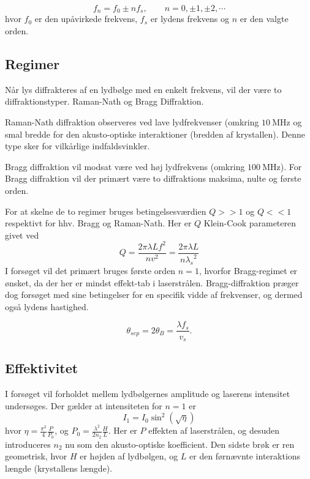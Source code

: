 \documentclass[main]{subfiles}
\begin{document}
\begin{equation}
    f_n = f_0 \pm nf_s, \qquad n=0, \pm1, \pm2, \cdots
    \label{eq:frequence}
\end{equation}
hvor $f_0$ er den upåvirkede frekvens, $f_s$ er lydens frekvens og $n$ er den valgte orden.

\subsection{Regimer}
Når lys diffrakteres af en lydbølge med en enkelt frekvens, vil der være to diffraktionstyper. Raman-Nath og Bragg Diffraktion.

Raman-Nath diffraktion observeres ved lave lydfrekvenser (omkring $\SI{10}{\mega\hertz}$ og smal bredde for den akusto-optiske interaktioner (bredden af krystallen). Denne type sker for vilkårlige indfaldsvinkler.

    Bragg diffraktion vil modsat være ved høj lydfrekvens (omkring $\SI{100}{\mega\hertz}$). For Bragg diffraktion vil der primært være to diffraktions maksima, nulte og første orden.

    For at skelne de to regimer bruges betingelsesværdien $Q>>1$ og $Q<<1$ respektivt for hhv. Bragg og Raman-Nath. Her er $Q$ Klein-Cook parameteren givet ved
    \begin{equation}
    Q = \frac{2\pi\lambda L f^2}{nv^2}=\frac{2\pi\lambda L}{n{\lambda_s}^2}
        \label{eq:KleinCook}
    \end{equation}
I forsøget vil det primært bruges første orden $n=1$, hvorfor Bragg-regimet er ønsket, da der her er mindst effekt-tab i laserstrålen. Bragg-diffraktion præger dog forsøget med sine betingelser for en specifik vidde af frekvenser, og dermed også lydens hastighed.

\begin{equation}
    \theta_{sep} = 2 \theta_B = \frac{\lambda f_s}{v_s}.
    \label{eq:sep}
\end{equation}


\subsection{Effektivitet}
I forsøget vil forholdet mellem lydbølgernes amplitude og laserens intensitet undersøges. Der gælder at intensiteten for $n=1$ er
\begin{equation}
    I_1 = I_0 \sin^2\left( \sqrt{\eta} \right)
    \label{eq:Intensitet}
\end{equation}
hvor $\eta = \frac{\pi^2}{4}\frac{P}{P_0}$, og $P_0 = \frac{\lambda^2}{2 n_2}\frac{H}{L}$. Her er $P$ effekten af laserstrålen, og desuden introduceres $n_2$ nu som den akusto-optiske koefficient. Den sidste brøk er ren geometrisk, hvor $H$ er højden af lydbølgen, og $L$ er den førnævnte interaktions længde (krystallens længde).
\end{document}
